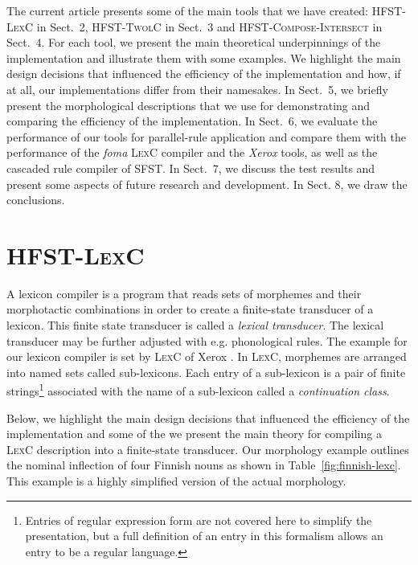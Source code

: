 \documentclass[a4paper]{article}
\begin{document}
The current article presents some of the main tools that we have
created: \textsc{HFST-LexC} in Sect.~2, \textsc{HFST-TwolC} in Sect.~3
and \textsc{HFST-Compose-Inter\-sect} in Sect.~4. For each tool, we
present the main theoretical underpinnings of the implementation and
illustrate them with some examples.  We highlight the main design
decisions that influenced the efficiency of the implementation and
how, if at all, our implementations differ from their namesakes. In
Sect.~5, we briefly present the morphological descriptions that we use
for demonstrating and comparing the efficiency of the
implementation. In Sect.~6, we evaluate the performance of our tools
for parallel-rule application and compare them with the performance of
the \textit{foma} \textsc{LexC} compiler and the \textit{Xerox} tools,
as well as the cascaded rule compiler of \textsc{SFST}. In Sect.~7, we
discuss the test results and present some aspects of future research
and development. In Sect. 8, we draw the conclusions.

\section{\textsc{HFST-LexC}}
\label{sec:HFST-LexC}

A lexicon compiler is a program that reads sets of morphemes and their
morphotactic combinations in order to create a finite-state transducer
of a lexicon.  This finite state transducer is called a \emph{lexical
transducer}\cite{Karttunen94}.  The lexical transducer may be further
adjusted with e.g. phonological rules. The example for our lexicon
compiler is set by \textsc{LexC} of Xerox \cite{beesley03}.  In
\textsc{LexC}, morphemes are arranged into named sets called
sub-lexicons. Each entry of a sub-lexicon is a pair of finite
strings\footnote{Entries of regular expression form are not covered
here to simplify the presentation, but a full definition of an entry
in this formalism allows an entry to be a regular language.}
associated with the name of a sub-lexicon called a \emph{continuation
class}.  

Below, we highlight the main design decisions that influenced the
efficiency of the implementation and some of the we present the main
theory for compiling a \textsc{LexC} description into a finite-state
transducer. Our morphology example outlines the nominal inflection of
four Finnish nouns as shown in Table~\ref{fig:finnish-lexc}.  This
example is a highly simplified version of the actual morphology.
\end{document}
